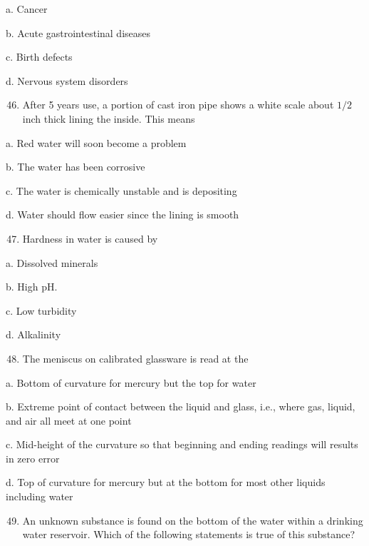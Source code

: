 \documentclass[10pt]{article}
\begin{document}
a. Cancer

b. Acute gastrointestinal diseases

c. Birth defects

d. Nervous system disorders

\begin{enumerate}
  \setcounter{enumi}{45}
  \item After 5 years use, a portion of cast iron pipe shows a white scale about $1 / 2$ inch thick lining the inside. This means
\end{enumerate}

a. Red water will soon become a problem

b. The water has been corrosive

c. The water is chemically unstable and is depositing

d. Water should flow easier since the lining is smooth

\begin{enumerate}
  \setcounter{enumi}{46}
  \item Hardness in water is caused by
\end{enumerate}

a. Dissolved minerals

b. High $\mathrm{pH}$.

c. Low turbidity

d. Alkalinity

\begin{enumerate}
  \setcounter{enumi}{47}
  \item The meniscus on calibrated glassware is read at the
\end{enumerate}

a. Bottom of curvature for mercury but the top for water

b. Extreme point of contact between the liquid and glass, i.e., where gas, liquid, and air all meet at one point

c. Mid-height of the curvature so that beginning and ending readings will results in zero error

d. Top of curvature for mercury but at the bottom for most other liquids including water

\begin{enumerate}
  \setcounter{enumi}{48}
  \item An unknown substance is found on the bottom of the water within a drinking water reservoir. Which of the following statements is true of this substance?
\end{enumerate}
\end{document}
